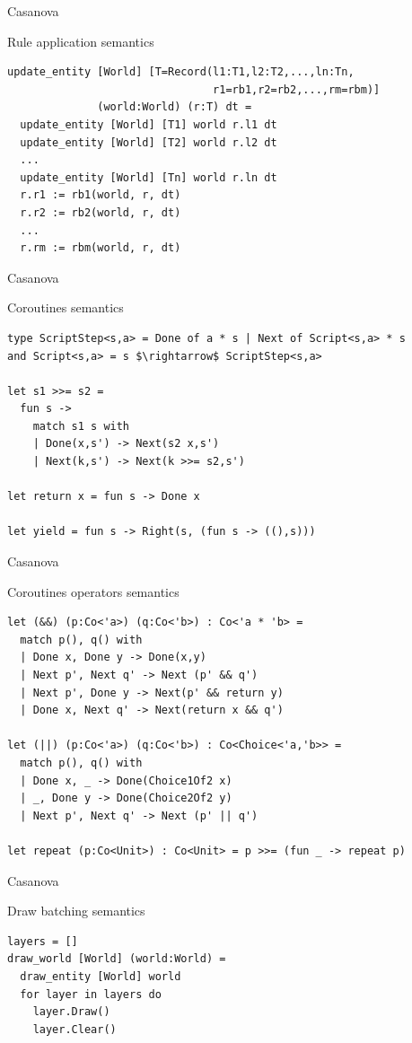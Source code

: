 \documentclass{beamer}
\begin{document}
\begin{frame}[fragile]{Casanova}
\begin{block}{Rule application semantics}
\begin{lstlisting}
update_entity [World] [T=Record(l1:T1,l2:T2,...,ln:Tn,
                                r1=rb1,r2=rb2,...,rm=rbm)] 
              (world:World) (r:T) dt =
  update_entity [World] [T1] world r.l1 dt
  update_entity [World] [T2] world r.l2 dt
  ...
  update_entity [World] [Tn] world r.ln dt
  r.r1 := rb1(world, r, dt)
  r.r2 := rb2(world, r, dt)
  ...
  r.rm := rbm(world, r, dt)
\end{lstlisting}
\end{block}
\end{frame}
\begin{frame}[fragile]{Casanova}
\begin{block}{Coroutines semantics}
\begin{lstlisting}
type ScriptStep<s,a> = Done of a * s | Next of Script<s,a> * s
and Script<s,a> = s $\rightarrow$ ScriptStep<s,a>

let s1 >>= s2 =
  fun s ->
    match s1 s with
    | Done(x,s') -> Next(s2 x,s')
    | Next(k,s') -> Next(k >>= s2,s')

let return x = fun s -> Done x

let yield = fun s -> Right(s, (fun s -> ((),s)))
\end{lstlisting}
\end{block}
\end{frame}
\begin{frame}[fragile]{Casanova}
\begin{block}{Coroutines operators semantics}
\begin{lstlisting}
let (&&) (p:Co<'a>) (q:Co<'b>) : Co<'a * 'b> =
  match p(), q() with
  | Done x, Done y -> Done(x,y)
  | Next p', Next q' -> Next (p' && q')
  | Next p', Done y -> Next(p' && return y)
  | Done x, Next q' -> Next(return x && q')

let (||) (p:Co<'a>) (q:Co<'b>) : Co<Choice<'a,'b>> =
  match p(), q() with
  | Done x, _ -> Done(Choice1Of2 x)
  | _, Done y -> Done(Choice2Of2 y)
  | Next p', Next q' -> Next (p' || q')

let repeat (p:Co<Unit>) : Co<Unit> = p >>= (fun _ -> repeat p)
\end{lstlisting}
\end{block}
\end{frame}
\begin{frame}[fragile]{Casanova}
\begin{block}{Draw batching semantics}
\begin{lstlisting}
layers = []
draw_world [World] (world:World) = 
  draw_entity [World] world
  for layer in layers do
    layer.Draw()
    layer.Clear()
\end{lstlisting}
\end{block}
\end{frame}
\end{document}
